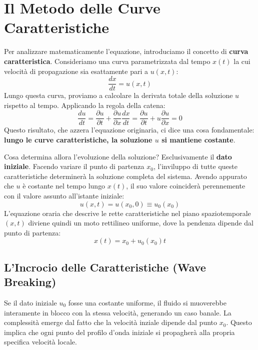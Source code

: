 \section{Il Metodo delle Curve Caratteristiche}

Per analizzare matematicamente l'equazione, introduciamo il concetto di \textbf{curva caratteristica}. Consideriamo una curva parametrizzata dal tempo $x(t)$ la cui velocità di propagazione sia esattamente pari a $u(x,t)$:
\begin{equation}
\frac{dx}{dt} = u(x,t)
\end{equation}
Lungo questa curva, proviamo a calcolare la derivata totale della soluzione $u$ rispetto al tempo. Applicando la regola della catena:
\begin{equation}
\frac{du}{dt} = \frac{\partial u}{\partial t} + \frac{\partial u}{\partial x} \frac{dx}{dt} = \frac{\partial u}{\partial t} + u \frac{\partial u}{\partial x} = 0
\end{equation}
Questo risultato, che azzera l'equazione originaria, ci dice una cosa fondamentale: \textbf{lungo le curve caratteristiche, la soluzione $u$ si mantiene costante}.

Cosa determina allora l'evoluzione della soluzione? Esclusivamente il \textbf{dato iniziale}. Facendo variare il punto di partenza $x_0$, l'inviluppo di tutte queste caratteristiche determinerà la soluzione completa del sistema. Avendo appurato che $u$ è costante nel tempo lungo $x(t)$, il suo valore coinciderà perennemente con il valore assunto all'istante iniziale:
\begin{equation}
u(x,t) = u(x_0, 0) \equiv u_0(x_0)
\end{equation}
L'equazione oraria che descrive le rette caratteristiche nel piano spaziotemporale $(x,t)$ diviene quindi un moto rettilineo uniforme, dove la pendenza dipende dal punto di partenza:
\begin{equation}
x(t) = x_0 + u_0(x_0) t
\end{equation}

\subsection{L'Incrocio delle Caratteristiche (Wave Breaking)}
Se il dato iniziale $u_0$ fosse una costante uniforme, il fluido si muoverebbe interamente in blocco con la stessa velocità, generando un caso banale. La complessità emerge dal fatto che la velocità inziale dipende dal punto $x_0$.
Questo implica che ogni punto del profilo d'onda iniziale si propagherà alla propria specifica velocità locale.

